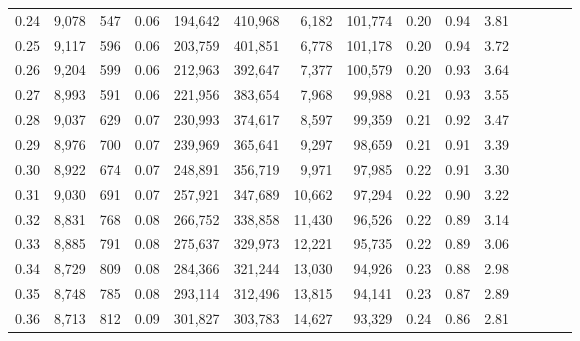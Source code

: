 \begin{tabular}{rrrcrrrrrrrrrrr}
0.24 &  9,078 &    547 &                                       0.06 &  194,642 &  410,968 &    6,182 &  101,774 &  0.20 &  0.94 &                         3.81 \\
0.25 &  9,117 &    596 &                                       0.06 &  203,759 &  401,851 &    6,778 &  101,178 &  0.20 &  0.94 &                         3.72 \\
0.26 &  9,204 &    599 &                                       0.06 &  212,963 &  392,647 &    7,377 &  100,579 &  0.20 &  0.93 &                         3.64 \\
0.27 &  8,993 &    591 &                                       0.06 &  221,956 &  383,654 &    7,968 &   99,988 &  0.21 &  0.93 &                         3.55 \\
0.28 &  9,037 &    629 &                                       0.07 &  230,993 &  374,617 &    8,597 &   99,359 &  0.21 &  0.92 &                         3.47 \\
0.29 &  8,976 &    700 &                                       0.07 &  239,969 &  365,641 &    9,297 &   98,659 &  0.21 &  0.91 &                         3.39 \\
0.30 &  8,922 &    674 &                                       0.07 &  248,891 &  356,719 &    9,971 &   97,985 &  0.22 &  0.91 &                         3.30 \\
0.31 &  9,030 &    691 &                                       0.07 &  257,921 &  347,689 &   10,662 &   97,294 &  0.22 &  0.90 &                         3.22 \\
0.32 &  8,831 &    768 &                                       0.08 &  266,752 &  338,858 &   11,430 &   96,526 &  0.22 &  0.89 &                         3.14 \\
0.33 &  8,885 &    791 &                                       0.08 &  275,637 &  329,973 &   12,221 &   95,735 &  0.22 &  0.89 &                         3.06 \\
0.34 &  8,729 &    809 &                                       0.08 &  284,366 &  321,244 &   13,030 &   94,926 &  0.23 &  0.88 &                         2.98 \\
0.35 &  8,748 &    785 &                                       0.08 &  293,114 &  312,496 &   13,815 &   94,141 &  0.23 &  0.87 &                         2.89 \\
0.36 &  8,713 &    812 &                                       0.09 &  301,827 &  303,783 &   14,627 &   93,329 &  0.24 &  0.86 &                         2.81 \\

\end{tabular}
